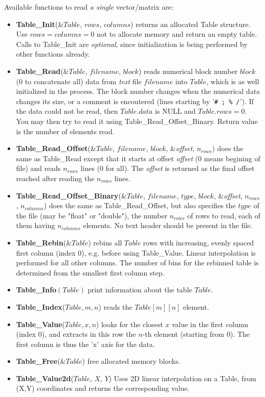 Available functions to read \emph{a single} vector/matrix are:
\begin{itemize}
\item \textbf{Table\_Init}(\&$Table$, $rows$, $columns$) returns an allocated
  Table structure. Use $rows=columns=0$ not to allocate memory and return an empty table.
  Calls to Table\_Init are \emph{optional}, since initialization is being
  performed by other functions already.
\item \textbf{Table\_Read}(\&$Table$, $filename$, $block$)
  reads numerical block number
  $block$ (0 to concatenate all) data from \emph{text} file $filename$ into $Table$,
  which is as well initialized in the process.
  The block number changes when the numerical data changes its size,
  or a comment is encoutered (lines starting
  by '\verb+# ; % /+'). If the data could not be read,
  then $Table.data$ is NULL and $Table.rows = 0$.
  You may then try to read it using Table\_Read\_Offset\_Binary.
  Return value is the number of elements read.
\item \textbf{Table\_Read\_Offset}(\&$Table$, $filename$, $block$, \&\textit{offset}, $n_{rows}$)
  does the same as Table\_Read except that it starts at offset \textit{offset}
  (0 means begining of file) and reads $n_{rows}$ lines (0 for all).
  The \textit{offset} is returned as the final offset reached after
  reading the $n_{rows}$ lines.
\item \textbf{Table\_Read\_Offset\_Binary}(\&$Table$, $filename$, $type$,
  $block$, \&\textit{offset}, $n_{rows}$, $n_{columns}$) does the same as
  Table\_Read\_Offset, but also specifies the $type$ of the file (may
  be "float" or "double"), the number $n_{rows}$ of rows to read, each
  of them having $n_{columns}$ elements. No text header should be present
  in the file.
\item \textbf{Table\_Rebin}(\&$Table$) rebins all $Table$ rows with increasing, evenly spaced first column (index 0), e.g. before using Table\_Value. Linear interpolation is performed for all other columns. The number of bins for the rebinned table is determined from the smallest first column step.
\item \textbf{Table\_Info}$(Table)$ print information about the table $Table$.
\item \textbf{Table\_Index}($Table, m, n$) reads the $Table[m][n]$ element.
\item \textbf{Table\_Value}($Table, x, n$) looks for the closest $x$
  value in the first column (index 0), and extracts in this row the
  $n$-th element (starting from 0). The first column is thus the 'x' axis for the data.
\item \textbf{Table\_Free}(\&$Table$) free allocated memory blocks.
\item \textbf{Table\_Value2d}($Table$, $X$, $Y$) Uses 2D linear interpolation on a Table, from (X,Y) coordinates and returns the corresponding value.
\end{itemize}

